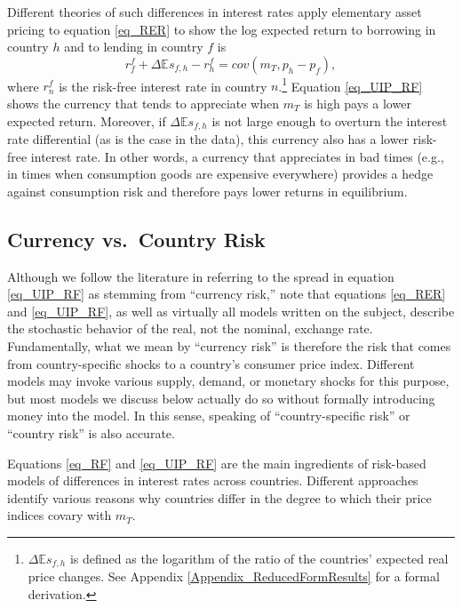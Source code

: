 \documentclass{ar-1col}
\begin{document}
Different theories of such differences in interest rates apply elementary asset pricing to equation \ref{eq_RER} to show the log expected return to borrowing in country $h$ and to lending in country $f$ is
\begin{equation}
  r^f_f + \Delta \mathbb{E} s_{f,h} - r^f_h 
  = cov \left( m_{T}, p_h - p_f\right),
  \label{eq_UIP_RF}
\end{equation}%
where $r^f_n$ is the risk-free interest rate in country $n$.\footnote{$\Delta \mathbb{E} s_{f,h}$ is defined as the logarithm of the ratio of the countries' expected real price changes. See Appendix \ref{Appendix_ReducedFormResults} for a formal derivation.} Equation \ref{eq_UIP_RF} shows the currency that tends to appreciate when $m_T$ is high pays a lower expected return. Moreover, if $\Delta \mathbb{E} s_{f,h}$ is not large enough to overturn the interest rate differential (as is the case in the data), this currency also has a lower risk-free interest rate. In other words, a currency that appreciates in bad times (e.g., in times when consumption goods are expensive everywhere) provides a hedge against consumption risk and therefore pays lower returns in equilibrium.

\begin{textbox}[]
\section{Currency vs.~Country Risk}
Although we follow the literature in referring to the spread in equation \ref{eq_UIP_RF} as stemming from ``currency risk,'' note that equations \ref{eq_RER} and \ref{eq_UIP_RF}, as well as virtually all models written on the subject, describe the stochastic behavior of the real, not the nominal, exchange rate. Fundamentally, what we mean by ``currency risk'' is therefore the risk that comes from country-specific shocks to a country's consumer price index. Different models may invoke various supply, demand, or monetary shocks for this purpose, but most models we discuss below actually do so without formally introducing money into the model. In this sense, speaking of ``country-specific risk'' or ``country risk'' is also accurate. 
\end{textbox}

Equations \ref{eq_RF} and \ref{eq_UIP_RF} are the main ingredients of risk-based models of differences in interest rates across countries. Different approaches identify various reasons why countries differ in the degree to which their price indices covary with $m_T$.
\end{document}
